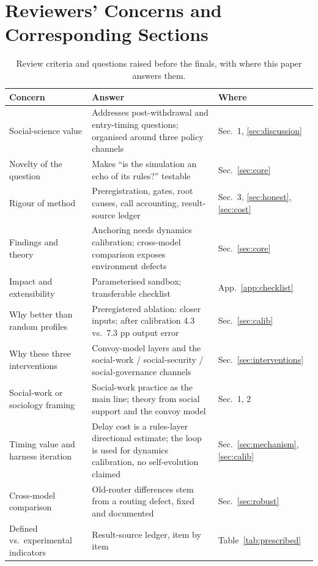 \documentclass[10pt,twocolumn]{article}
\begin{document}



\appendix
\section{Reviewers' Concerns and Corresponding Sections}\label{app:review}
\begin{table}[H]
\centering\small
\caption{Review criteria and questions raised before the finals, with where this paper answers them.}
\label{tab:review}
\begin{tabular}{@{}>{\raggedright\arraybackslash}p{}>{\raggedright\arraybackslash}p{}>{\raggedright\arraybackslash}p{}@{}}
\toprule
Concern & Answer & Where \\
\midrule
Social-science value & Addresses post-withdrawal and entry-timing questions; organised around three policy channels & Sec.~1, \ref{sec:discussion} \\
Novelty of the question & Makes ``is the simulation an echo of its rules?'' testable & Sec.~\ref{sec:core} \\
Rigour of method & Preregistration, gates, root causes, call accounting, result-source ledger & Sec.~3, \ref{sec:honest}, \ref{sec:cost} \\
Findings and theory & Anchoring needs dynamics calibration; cross-model comparison exposes environment defects & Sec.~\ref{sec:core} \\
Impact and extensibility & Parameterised sandbox; transferable checklist & App.~\ref{app:checklist} \\
\midrule
Why better than random profiles & Preregistered ablation: closer inputs; after calibration 4.3 vs.\ 7.3 pp output error & Sec.~\ref{sec:calib} \\
Why these three interventions & Convoy-model layers and the social-work / social-security / social-governance channels & Sec.~\ref{sec:interventions} \\
Social-work or sociology framing & Social-work practice as the main line; theory from social support and the convoy model & Sec.~1, 2 \\
Timing value and harness iteration & Delay cost is a rules-layer directional estimate; the loop is used for dynamics calibration, no self-evolution claimed & Sec.~\ref{sec:mechanism}, \ref{sec:calib} \\
Cross-model comparison & Old-router differences stem from a routing defect, fixed and documented & Sec.~\ref{sec:robust} \\
Defined vs.\ experimental indicators & Result-source ledger, item by item & Table~\ref{tab:prescribed} \\
\bottomrule
\end{tabular}
\end{table}
\end{document}
